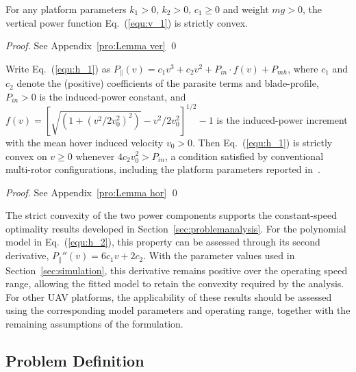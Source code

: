 \begin{lemma}
    \label{lem:ver}
    For any platform parameters $k_1 > 0$, $k_2 > 0$, $c_1 \geq 0$ and weight $mg > 0$, the vertical power function Eq.~(\ref{equ:v_1}) is strictly convex.
\end{lemma}

\begin{proof}
    See Appendix~\ref{pro:Lemma ver} \qed
\end{proof}

\begin{lemma}
    \label{lem:hor}
     Write Eq.~(\ref{equ:h_1}) as $P_\parallel(v) = c_1v^3 + c_2v^2 + P_{in}\cdot f(v) + P_{mh}$, where $c_1$ and $c_2$ denote the (positive) coefficients of the parasite terms and blade-profile, $P_{in} > 0$ is the induced-power constant, and $f(v) = [\sqrt{(1 + (v^2/2v_0^2)^2)} - v^2/2v_0^2]^{1/2} - 1$ is the induced-power increment with the mean hover induced velocity $v_0 > 0$.
     Then Eq.~(\ref{equ:h_1}) is strictly convex on $v \geq 0$ whenever $4c_2v_0^2 > P_{in}$, a condition satisfied by conventional multi-rotor configurations, including the platform parameters reported in~\cite{GongHao}.
\end{lemma}

\begin{proof}
    See Appendix~\ref{pro:Lemma hor} \qed
\end{proof}

The strict convexity of the two power components supports the constant-speed optimality results developed in Section~\ref{sec:problemanalysis}.
For the polynomial model in Eq.~(\ref{equ:h_2}), this property can be assessed through its second derivative, $P_\parallel''(v)=6c_1v+2c_2$.
With the parameter values used in Section~\ref{sec:simulation}, this derivative remains positive over the operating speed range, allowing the fitted model to retain the convexity required by the analysis.
For other UAV platforms, the applicability of these results should be assessed using the corresponding model parameters and operating range, together with the remaining assumptions of the formulation.


\subsection{Problem Definition}
\label{subsection:problem}

